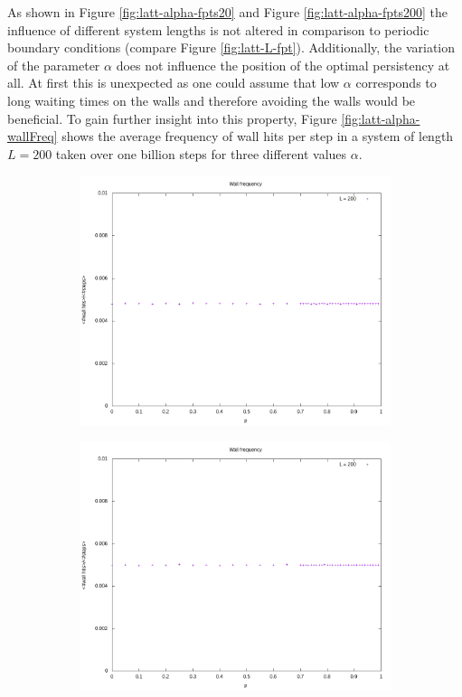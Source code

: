 \documentclass[]{scrartcl}
\begin{document}
As shown in Figure \ref{fig:latt-alpha-fpts20} and Figure \ref{fig:latt-alpha-fpts200} the influence of different system lengths is not altered in comparison to periodic boundary conditions (compare Figure \ref{fig:latt-L-fpt}). Additionally, the variation of the parameter $\alpha$ does not influence the position of the optimal persistency at all. At first this is unexpected as one could assume that low $\alpha$ corresponds to long waiting times on the walls and therefore avoiding the walls would be beneficial. To gain further insight into this property, Figure \ref{fig:latt-alpha-wallFreq} shows the average frequency of wall hits per step in a system of length $L = 200$ taken over one billion steps for three different values $\alpha$.

 \begin{figure}[!hbt]
\centering
\begin{subfigure}{0.45\textwidth}
 \includegraphics[width=\textwidth]{./fig/latt/alpha/wallFreq/WF-alpha=01-rel.png}
\end{subfigure}
\begin{subfigure}{0.45\textwidth}
 \includegraphics[width=\textwidth]{./fig/latt/alpha/wallFreq/WF-alpha=05-rel.png}

\end{subfigure}
\end{figure}
\end{document}
